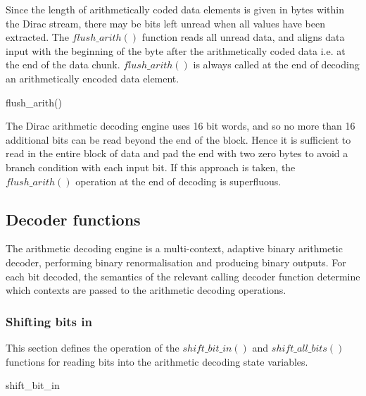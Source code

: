 Since the length of arithmetically coded data elements is given in bytes within the Dirac
stream, there may be bits left unread when all values have been extracted. The $flush\_arith()$
function reads all unread data, and aligns data input with the beginning of the byte 
after the arithmetically coded data i.e. at the end of the
data chunk. $flush\_arith()$ is always called at the end of decoding an arithmetically encoded
data element.

\begin{pseudo}{flush\_arith()}{}
\bsEND
\end{pseudo}

\begin{informative}
The Dirac arithmetic decoding engine uses 16 bit words, and so no more than 16
additional bits can be read beyond the end of the block. Hence it is sufficient
to read in the entire block of data and pad the end with two zero bytes to
avoid a branch condition with each input bit. If this approach is taken, the
$flush\_arith()$ operation at the end of decoding is superfluous.
\end{informative}

\subsection{Decoder functions}
\label{extractarith}
The arithmetic decoding engine is a multi-context, adaptive binary
arithmetic decoder, performing binary renormalisation and producing
binary outputs. For each bit decoded, the semantics of the relevant
calling decoder function determine which contexts are passed to the
arithmetic decoding operations.

\subsubsection{Shifting bits in}

\label{arithshiftin}

This section defines the operation of the $shift\_bit\_in()$ 
and $shift\_all\_bits()$ functions
for reading bits into the arithmetic decoding state variables.

\begin{pseudo}{shift\_bit\_in}{}
\end{pseudo}

